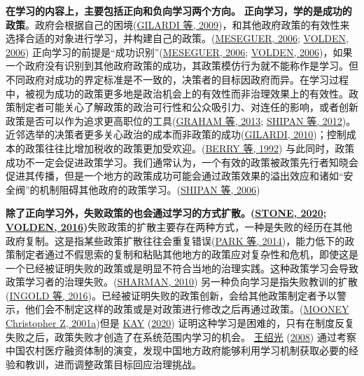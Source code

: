 \documentclass[
  12pt,
]{ctexart}
\begin{document}
\textbf{在学习的内容上，主要包括正向和负向学习两个方向。}
\textbf{正向学习，学的是成功的政策}。政府会根据自己的困境(\protect\hyperlink{ref-GilardiEtAl2009}{GILARDI 等, 2009})，和其他政府政策的有效性来选择合适的对象进行学习，并构建自己的政策。(\protect\hyperlink{ref-Meseguer2006}{MESEGUER, 2006}; \protect\hyperlink{ref-Volden2006}{VOLDEN, 2006})
正向学习的前提是``成功识别''(\protect\hyperlink{ref-Meseguer2006}{MESEGUER, 2006}; \protect\hyperlink{ref-Volden2006}{VOLDEN, 2006})，如果一个政府没有识别到其他政府政策的成功，其政策模仿行为就不能称作是学习。但不同政府对成功的界定标准是不一致的，决策者的目标因政府而异。在学习过程中，被视为成功的政策更多地是政治机会上的有效性而非治理效果上的有效性。政策制定者可能关心了解政策的政治可行性和公众吸引力、对连任的影响，或者创新政策是否可以作为追求更高职位的工具(\protect\hyperlink{ref-GrahamEtAl2013}{GRAHAM 等, 2013}; \protect\hyperlink{ref-ShipanVolden2012}{SHIPAN 等, 2012})。近邻选举的决策者更多关心政治的成本而非政策的成功(\protect\hyperlink{ref-Gilardi2010b}{GILARDI, 2010})；控制成本的政策往往比增加税收的政策更加受欢迎。(\protect\hyperlink{ref-BerryBerry1992}{BERRY 等, 1992})
与此同时，政策成功不一定会促进政策学习。我们通常认为，一个有效的政策被政策先行者知晓会促进其传播，但是一个地方的政策成功可能会通过政策效果的溢出效应和诸如``安全阀''的机制阻碍其他政府的政策学习。(\protect\hyperlink{ref-ShipanVolden2006}{SHIPAN 等, 2006})

\textbf{除了正向学习外，失败政策的也会通过学习的方式扩散。(\protect\hyperlink{ref-Stone2020}{STONE, 2020}; \protect\hyperlink{ref-Volden2016}{VOLDEN, 2016})}失败政策的扩散主要存在两种方式，一种是失败的经历在其他政府复制。这是指某些政策扩散往往会重复错误(\protect\hyperlink{ref-ParkBerry2014}{PARK 等, 2014})，能力低下的政策制定者通过不假思索的复制和粘贴其他地方的政策应对复杂性和危机，即使这是一个已经被证明失败的政策或是明显不符合当地的治理实践。这种政策学习会导致政策学习者的治理失败。(\protect\hyperlink{ref-Sharman2010}{SHARMAN, 2010})
另一种负向学习是指失败教训的扩散(\protect\hyperlink{ref-IngoldMonaghan2016}{INGOLD 等, 2016})。已经被证明失败的政策创新，会给其他政策制定者予以警示，他们会不制定这样的政策或是对政策进行修改之后再通过政策。(\protect\hyperlink{ref-Mooney2001}{MOONEY Christopher Z, 2001a})但是 \protect\hyperlink{ref-Kay2020}{KAY} (\protect\hyperlink{ref-Kay2020}{2020}) 证明这种学习是困难的，只有在制度反复失败之后，政策失败才创造了在系统范围内学习的机会。 \protect\hyperlink{ref-WangShaoGuang2008a}{王绍光} (\protect\hyperlink{ref-WangShaoGuang2008a}{2008}) 通过考察中国农村医疗融资体制的演变，发现中国地方政府能够利用学习机制获取必要的经验和教训，进而调整政策目标回应治理挑战。
\end{document}
